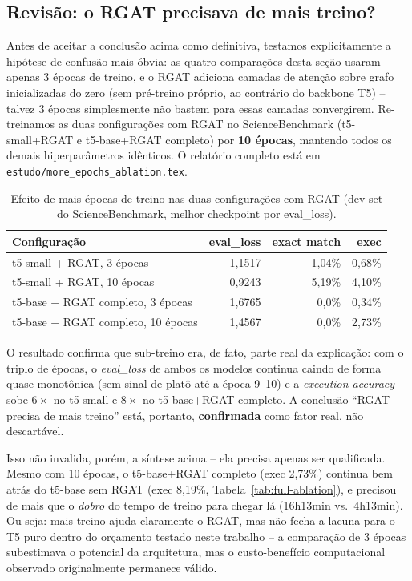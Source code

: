 \subsection{Revisão: o RGAT precisava de mais treino?}
\label{sec:more-epochs-review}

Antes de aceitar a conclusão acima como definitiva, testamos
explicitamente a hipótese de confusão mais óbvia: as quatro comparações
desta seção usaram apenas 3 épocas de treino, e o RGAT adiciona camadas
de atenção sobre grafo inicializadas do zero (sem pré-treino próprio,
ao contrário do backbone T5) -- talvez 3 épocas simplesmente não bastem
para essas camadas convergirem. Re-treinamos as duas configurações com
RGAT no ScienceBenchmark (t5-small+RGAT e t5-base+RGAT completo) por
\textbf{10 épocas}, mantendo todos os demais hiperparâmetros idênticos.
O relatório completo está em \texttt{estudo/more\_epochs\_ablation.tex}.

\begin{table}[h]
\centering
\caption{Efeito de mais épocas de treino nas duas configurações com RGAT (dev set do ScienceBenchmark, melhor checkpoint por eval\_loss).}
\label{tab:more-epochs-summary}
\begin{tabular}{lrrr}
\toprule
\textbf{Configuração} & \textbf{eval\_loss} & \textbf{exact match} & \textbf{exec} \\
\midrule
t5-small + RGAT, 3 épocas   & 1,1517 & 1,04\% & 0,68\% \\
t5-small + RGAT, 10 épocas  & 0,9243 & 5,19\% & 4,10\% \\
\midrule
t5-base + RGAT completo, 3 épocas  & 1,6765 & 0,0\% & 0,34\% \\
t5-base + RGAT completo, 10 épocas & 1,4567 & 0,0\% & 2,73\% \\
\bottomrule
\end{tabular}
\end{table}

O resultado confirma que sub-treino era, de fato, parte real da
explicação: com o triplo de épocas, o \emph{eval\_loss} de ambos os
modelos continua caindo de forma quase monotônica (sem sinal de platô
até a época 9--10) e a \emph{execution accuracy} sobe
$6\times$ no t5-small e $8\times$ no t5-base+RGAT completo. A conclusão
``RGAT precisa de mais treino'' está, portanto, \textbf{confirmada}
como fator real, não descartável.

Isso não invalida, porém, a síntese acima -- ela precisa apenas ser
qualificada. Mesmo com 10 épocas, o t5-base+RGAT completo
(exec 2,73\%) continua bem atrás do t5-base sem RGAT
(exec 8,19\%, Tabela~\ref{tab:full-ablation}), e precisou de mais que
o \emph{dobro} do tempo de treino para chegar lá (16h13min vs.\
4h13min). Ou seja: mais treino ajuda claramente o RGAT, mas não fecha
a lacuna para o T5 puro dentro do orçamento testado neste trabalho --
a comparação de 3 épocas subestimava o potencial da arquitetura, mas o
custo-benefício computacional observado originalmente permanece
válido.
